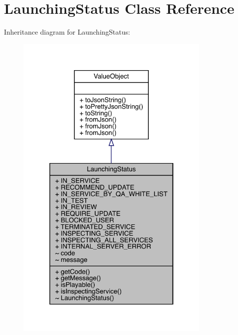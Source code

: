 \hypertarget{classcom_1_1toast_1_1android_1_1gamebase_1_1launching_1_1data_1_1_launching_status}{}\section{Launching\+Status Class Reference}
\label{classcom_1_1toast_1_1android_1_1gamebase_1_1launching_1_1data_1_1_launching_status}


Inheritance diagram for Launching\+Status\+:
\nopagebreak
\begin{figure}[H]
\begin{center}
\leavevmode
\includegraphics[width=267pt]{classcom_1_1toast_1_1android_1_1gamebase_1_1launching_1_1data_1_1_launching_status__inherit__graph}
\end{center}
\end{figure}


